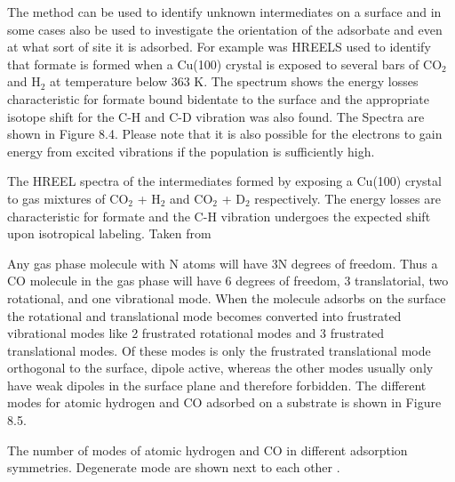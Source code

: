  The method can be used to identify unknown intermediates on a surface and in some cases also be used to investigate the orientation of the adsorbate and even at what sort of site it is adsorbed. For example was HREELS used to identify that formate is formed when  a Cu(100) crystal is exposed to several bars of CO$_{2}$ and H$_{2}$ at temperature below 363 K. The spectrum shows the energy losses characteristic for formate bound bidentate to the surface and the appropriate isotope shift for the C-H and C-D vibration was also found. The Spectra are shown in Figure 8.4. Please note that it is also possible for the electrons to gain energy from excited vibrations if the population is sufficiently high.



\vspace*{11cm}

 The HREEL spectra of the intermediates formed by exposing a Cu(100) crystal to gas mixtures of  CO$_{2}$ + H$_{2}$ and  CO$_{2}$ + D$_{2}$ respectively. The energy losses are characteristic for formate and the C-H vibration undergoes the expected shift upon isotropical labeling. Taken from \cite{Formate}

\vspace{1cm}

Any gas phase molecule with N atoms  will have 3N degrees of freedom. Thus a CO molecule in the gas phase will have 6 degrees of freedom, 3 translatorial, two rotational, and one vibrational mode. When the molecule adsorbs on the surface the rotational and translational mode becomes converted into frustrated vibrational modes like 2 frustrated rotational modes and 3 frustrated translational modes. Of these modes is only the frustrated translational mode orthogonal to the surface, dipole active, whereas the other modes usually only have weak dipoles in the surface plane and therefore forbidden. The different modes for atomic hydrogen and CO adsorbed on a substrate is shown in Figure 8.5.

\vspace*{11cm}

 The number of modes of atomic hydrogen and CO in different adsorption symmetries. Degenerate mode are shown next to each other \cite{Bradshaw}.

\vspace{1cm} 

